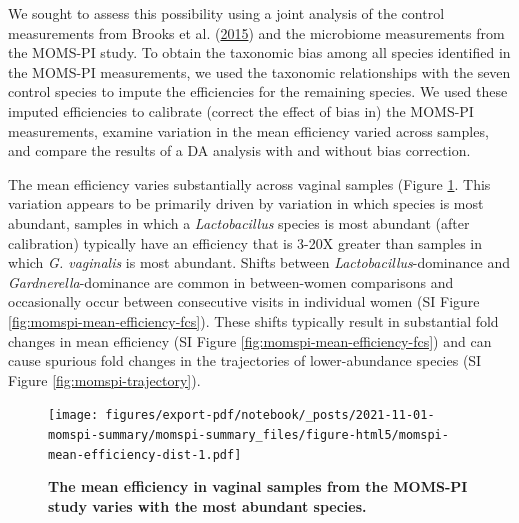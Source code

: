 \documentclass[
]{article}
\begin{document}
We sought to assess this possibility using a joint analysis of the control measurements from Brooks et al. (\protect\hyperlink{ref-brooks2015thet}{2015}) and the microbiome measurements from the MOMS-PI study.
To obtain the taxonomic bias among all species identified in the MOMS-PI measurements, we used the taxonomic relationships with the seven control species to impute the efficiencies for the remaining species.
We used these imputed efficiencies to calibrate (correct the effect of bias in) the MOMS-PI measurements, examine variation in the mean efficiency varied across samples, and compare the results of a DA analysis with and without bias correction.

The mean efficiency varies substantially across vaginal samples (Figure \ref{fig:momspi-mean-efficiency-dist}.
This variation appears to be primarily driven by variation in which species is most abundant, samples in which a \emph{Lactobacillus} species is most abundant (after calibration) typically have an efficiency that is 3-20X greater than samples in which \emph{G. vaginalis} is most abundant.
Shifts between \emph{Lactobacillus}-dominance and \emph{Gardnerella}-dominance are common in between-women comparisons and occasionally occur between consecutive visits in individual women (SI Figure \ref{fig:momspi-mean-efficiency-fcs}).
These shifts typically result in substantial fold changes in mean efficiency (SI Figure \ref{fig:momspi-mean-efficiency-fcs}) and can cause spurious fold changes in the trajectories of lower-abundance species (SI Figure \ref{fig:momspi-trajectory}).

\begin{figure}
\centering
\texttt{[image: figures/export-pdf/notebook/\_posts/2021-11-01-momspi-summary/momspi-summary\_files/figure-html5/momspi-mean-efficiency-dist-1.pdf]}
\caption{\label{fig:momspi-mean-efficiency-dist}\textbf{The mean efficiency in vaginal samples from the MOMS-PI study varies with the most abundant species.}}
\end{figure}
\end{document}
